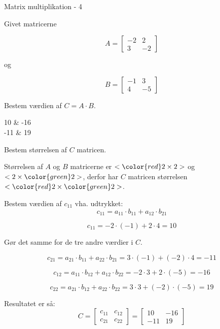 \documentclass{article}
\begin{document}
\newpage

\begin{exercise}{Matrix multiplikation - 4}
	
	Givet matricerne 
	
	\[
	A = \left[\begin{array}{rr}
	-2 & 2 \\ 
	3 & -2 
	\end{array} \right]
	\]
	
	og 
	
	\[
	B = \left[\begin{array}{rr}
	-1 & 3 \\ 
	4 & -5 
	\end{array} \right]
	\]
	
	Bestem værdien af $C = A \cdot B$.
	
	\begin{answermatrix}
		10 & -16  \\
		-11 & 19 
	\end{answermatrix}
	
	\hint
	Bestem størrelsen af $C$ matricen.
	
	\hint
	Størrelsen af $A$ og $B$ matricerne er $<{\color{red} 2} \times 2>$ og $<2 \times {\color{green}2}>$, 
	derfor har $C$ matricen størrelsen $<{\color{red} 2} \times {\color{green}2}>$.
	
	\hint
	Bestem værdien af $c_{11}$ vha. udtrykket:
	\[
	c_{11} = a_{11} \cdot b_{11} + a_{12} \cdot b_{21}
	\]
	
	\hint
	\[
	c_{11} = -2 \cdot (-1) + 2 \cdot 4 = 10
	\]
	
	\hint
	Gør det samme for de tre andre værdier i $C$.
	
	\hint
	\[
		c_{21} = a_{21} \cdot b_{11} + a_{22} \cdot b_{21} = 3 \cdot (-1) + (-2) \cdot 4 = -11
	\]
	
	\hint
	\[
		c_{12} = a_{11} \cdot b_{12} + a_{12} \cdot b_{22} = -2 \cdot 3 + 2 \cdot (-5) = -16
	\]
	
	\hint
	\[
		c_{22} = a_{21} \cdot b_{12} + a_{22} \cdot b_{22} = 3 \cdot 3 + (-2) \cdot (-5) = 19
	\]
	
	
	\hint
	Resultatet er så:
	\[
	C = \left[\begin{array}{rr}
	c_{11} & c_{12} \\
	c_{21} & c_{22} 
	\end{array} \right] = 
	\left[\begin{array}{rr}
	10 & -16 \\
	-11 & 19 
	\end{array} \right]
	\]
	
	
\end{exercise}
\end{document}
